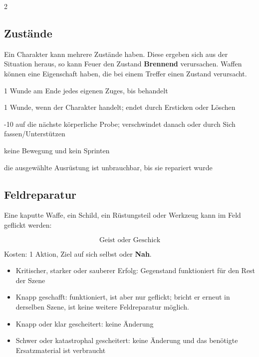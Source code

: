 \begin{multicols*}{2}
\subsection{Zustände}\label{sec:zustande}

Ein Charakter kann mehrere Zustände haben.
Diese ergeben sich aus der Situation heraus, so kann Feuer den Zustand \textbf{Brennend} verursachen.
Waffen können eine Eigenschaft haben, die bei einem Treffer einen Zustand verursacht.

\begin{description}[style=nextline,leftmargin=0pt]
\item[\textbf{Blutend}] 1 Wunde am Ende jedes eigenen Zuges, bis behandelt
\item[\textbf{Brennend}] 1 Wunde, wenn der Charakter handelt; endet durch Ersticken oder Löschen
\item[\textbf{Erschüttert}] -10 auf die nächste körperliche Probe; verschwindet danach oder durch Sich fassen/Unterstützen
\item[\textbf{Festgesetzt}] keine Bewegung und kein Sprinten
\item[\textbf{Zerstört}] die ausgewählte Ausrüstung ist unbrauchbar, bis sie repariert wurde
\end{description}

\subsection{Feldreparatur}

Eine kaputte Waffe, ein Schild, ein Rüstungsteil oder Werkzeug kann im Feld geflickt werden:

\[
\text{Geist oder Geschick}
\]

Kosten: 1 Aktion, Ziel auf sich selbst oder \textbf{Nah}.

\begin{itemize}[leftmargin=*]
\item Kritischer, starker oder sauberer Erfolg: Gegenstand funktioniert für den Rest der Szene
\item Knapp geschafft: funktioniert, ist aber nur geflickt; bricht er erneut in derselben Szene, ist keine weitere Feldreparatur möglich.
\item Knapp oder klar gescheitert: keine Änderung
\item Schwer oder katastrophal gescheitert: keine Änderung und das benötigte Ersatzmaterial ist verbraucht
\end{itemize}


\end{multicols*}
